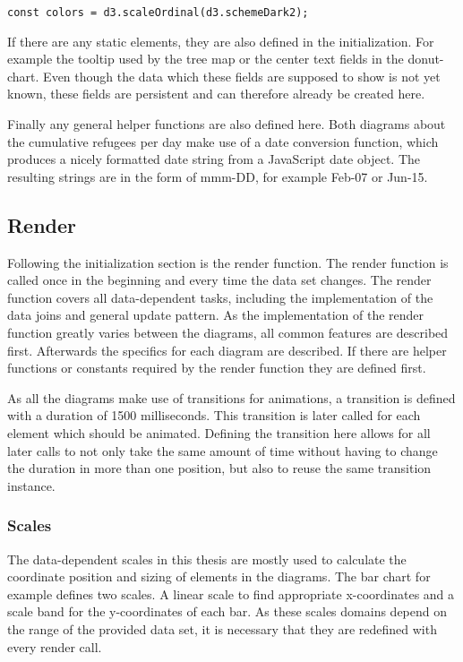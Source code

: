 \begin{minipage}{0.9\linewidth}
    \begin{lstlisting}[style=htmlCSSjs, captionpos=b, caption={Definition of the data independent color scale. \texttt{d3.schemeDarkv2} is a predefined list of color values which is  used as the range of the scale.}, label={color_scale}]
const colors = d3.scaleOrdinal(d3.schemeDark2);
    \end{lstlisting}
\end{minipage}

If there are any static elements, they are also defined in the initialization. For example the tooltip used by the tree map or the center text fields in the donut-chart. Even though the data which these fields are supposed to show is not yet known, these fields are persistent and can therefore already be created here.

Finally any general helper functions are also defined here. Both diagrams about the cumulative refugees per day make use of a date conversion function, which produces a nicely formatted date string from a JavaScript date object. The resulting strings are in the form of mmm-DD, for example Feb-07 or Jun-15.

\subsection{Render}\label{sec:render}
Following the initialization section is the render function. The render function is called once in the beginning and every time the data set changes. The render function covers all data-dependent tasks, including the implementation of the data joins and general update pattern. As the implementation of the render function greatly varies between the diagrams, all common features are described first. Afterwards the specifics for each diagram are described. If there are helper functions or constants required by the render function they are defined first. 

As all the diagrams make use of transitions for animations, a transition is defined with a duration of 1500 milliseconds. This transition is later called for each element which should be animated. Defining the transition here allows for all later calls to not only take the same amount of time without having to change the duration in more than one position, but also to reuse the same transition instance.

\subsubsection{Scales}
The data-dependent scales in this thesis are mostly used to calculate the coordinate position and sizing of elements in the diagrams. The bar chart for example defines two scales. A linear scale to find appropriate x-coordinates and a scale band for the y-coordinates of each bar. As these scales domains depend on the range of the provided data set, it is necessary that they are redefined with every render call.

